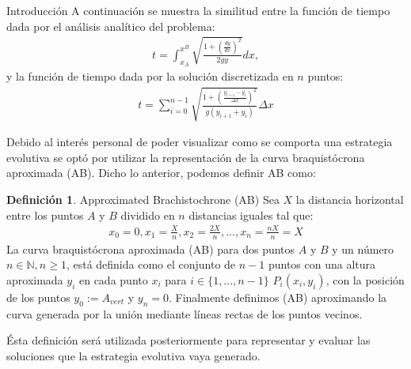 \documentclass[10pt, letterpaper]{article}
\theoremstyle{definition}
\newtheorem{definition}{Definición}[section]
\begin{document}
\begin{section}{Introducción}
    A continuación se muestra la similitud entre la función de tiempo dada por
    el análisis analítico del problema:
    \begin{equation} \begin{gathered}
        t = \int_{x_A}^{x^B} \sqrt{\frac{1 + (\frac{dy}{dx})^2}{2gy}} dx,
    \end{gathered} \end{equation}
    y la función de tiempo dada por la solución discretizada en $n$ puntos:
    \begin{equation} \begin{gathered}
        t = \sum_{i=0}^{n-1} \sqrt{\frac{1 + (\frac{y_{i+1} - y_i}{\Delta x})^2}{g(y_{i+1} + y_i)}}\Delta x
    \end{gathered} \end{equation}

    Debido al interés personal de poder visualizar como se comporta una estrategia
    evolutiva se optó por utilizar la representación de la curva braquistócrona
    aproximada (AB). Dicho lo anterior, podemos definir AB como:
    \begin{definition}{Approximated Brachistochrone (AB)}
        Sea $X$ la distancia horizontal entre los puntos $A$ y $B$ dividido
        en $n$ distancias iguales tal que:
        \begin{equation} \begin{gathered}
            x_0 = 0, x_1 = \frac{X}{n}, x_2 = \frac{2X}{n}, ..., x_n=\frac{nX}{n}=X
        \end{gathered} \end{equation}
        La curva braquistócrona aproximada (AB) para dos puntos $A$ y $B$ y un
        número $n \in \mathbb{N}, n \geq 1$, está definida como el conjunto de
        $n-1$ puntos con una altura aproximada $y_i$ en cada punto $x_i$ para
        $i \in \{1,...,n-1\}$ $P_i(x_i, y_i)$, con la posición de los puntos $y_0 := A_{vert}$
        y $y_n=0$.
        Finalmente definimos (AB) aproximando la curva generada por la unión
        mediante líneas rectas de los puntos vecinos.
    \end{definition}

    Ésta definición será utilizada posteriormente para representar y evaluar
    las soluciones que la estrategia evolutiva vaya generado.

\end{section}
\end{document}
